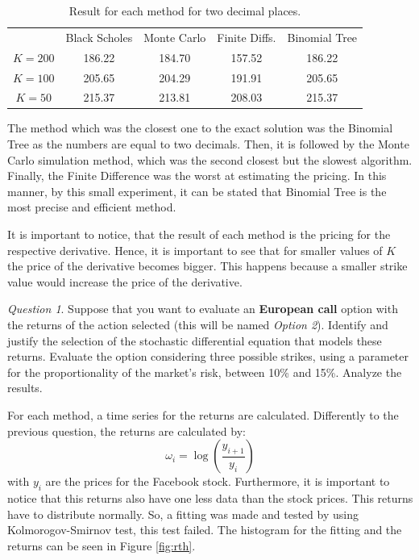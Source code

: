 \documentclass[11pt]{article}
\theoremstyle{definition}
\theoremstyle{remark}
\theoremstyle{remark}
\newtheorem{question}{Question}
\begin{document}
\begin{table}[H]
\centering
\begin{tabular}{ccccc}
\hline
        & Black Scholes & Monte Carlo & Finite Diffs. & Binomial Tree \\
$K=200$ & 186.22        & 184.70      & 157.52        & 186.22        \\
$K=100$ & 205.65        & 204.29      & 191.91        & 205.65        \\
$K=50$  & 215.37        & 213.81      & 208.03        & 215.37        \\ \hline
\end{tabular}
\caption{Result for each method for two decimal places.}
\label{tab:comp1}
\end{table}

The method which was the closest one to the exact solution was the Binomial Tree
as the numbers are equal to two decimals. Then, it is followed by the Monte
Carlo simulation method, which was the second closest but the slowest algorithm.
Finally, the Finite Difference was the worst at estimating the pricing. In this
manner, by this small experiment, it can be stated that Binomial Tree is the
most precise and efficient method.

It is important to notice, that the result of each method is the pricing for the
respective derivative. Hence, it is important to see that for smaller values of
$K$ the price of the derivative becomes bigger. This happens because a smaller
strike value would increase the price of the derivative.
\begin{question}
  Suppose that you want to evaluate an \textbf{European call} option with the
  returns of the action selected (this will be named \textit{Option 2}).
  Identify and justify the selection of the stochastic differential equation
  that models these returns. Evaluate the option considering three possible
  strikes, using a parameter for the proportionality of the market's risk,
  between 10\% and 15\%. Analyze the results.
\end{question}


For each method, a time series for the returns are calculated. Differently to
the previous question, the returns are calculated by:
\begin{equation*}
  \omega_{i} = \log\left(\frac{y_{i + 1}}{y_{i}}\right)
\end{equation*}
with $y_{i}$ are the prices for the Facebook stock. Furthermore, it is important
to notice that this returns also have one less data than the stock prices. This
returns have to distribute normally. So, a fitting was made and tested by using
Kolmorogov-Smirnov test, this test failed. The histogram for the fitting and the
returns can be seen in Figure \ref{fig:rth}.
\end{document}
